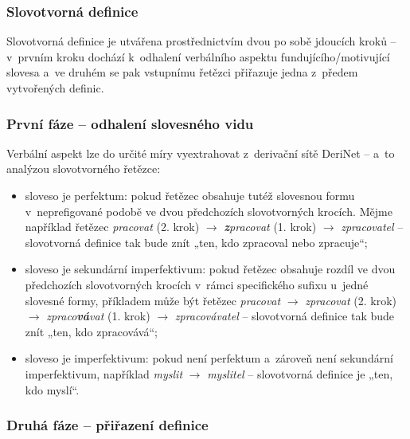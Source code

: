 \hypertarget{slovotvornuxe1-definice}{%
\subsubsection{Slovotvorná definice}\label{slovotvornuxe1-definice}}

Slovotvorná definice je utvářena prostřednictvím dvou po sobě jdoucích
kroků -- v~prvním kroku dochází k~odhalení verbálního aspektu
fundujícího/motivující slovesa a~ve druhém se pak vstupnímu řetězci
přiřazuje jedna z~předem vytvořených definic.

\hypertarget{prvni-faze}{%
\subsubsection*{První fáze -- odhalení slovesného vidu}\label{prvni-faze}}

Verbální aspekt lze do určité míry vyextrahovat z~derivační sítě DeriNet
-- a~to analýzou slovotvorného řetězce:

\begin{itemize}
\tightlist
\item
  sloveso je perfektum: pokud řetězec obsahuje tutéž slovesnou formu
v~neprefigované podobě ve dvou předchozích slovotvorných krocích. Mějme
  například řetězec \emph{pracovat} (2. krok) $\rightarrow$
  \emph{\textbf{z}pracovat} (1. krok) $\rightarrow$
  \emph{zpracovatel} -- slovotvorná definice tak bude znít „ten, kdo
  zpracoval nebo zpracuje``;
\item
  sloveso je sekundární imperfektivum: pokud řetězec obsahuje rozdíl ve
  dvou předchozích slovotvorných krocích v~rámci specifického sufixu
u~jedné slovesné formy, příkladem může být řetězec \emph{pracovat}
  $\rightarrow$ \emph{zpracovat} (2. krok) $\rightarrow$
  \emph{zpraco\textbf{vá}vat} (1. krok) $\rightarrow$
  \emph{zpracovávatel} -- slovotvorná definice tak bude znít „ten, kdo
  zpracovává``;
\item
  sloveso je imperfektivum: pokud není perfektum a~zároveň není
  sekundární imperfektivum, například \emph{myslit} $\rightarrow$
  \emph{myslitel} -- slovotvorná definice je „ten, kdo myslí``.
\end{itemize}

\hypertarget{druha-faze}{%
\subsubsection*{Druhá fáze -- přiřazení definice}\label{druha-faze}}

